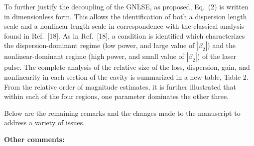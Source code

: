 \documentclass[12pt,twoside,letterpaper]{article}
\begin{document}
To further justify the decoupling of the GNLSE, as proposed, Eq.~(2) is written in dimensionless form. This allows the identification of both a dispersion length scale and a nonlinear length scale in correspondence with the classical analysis found in Ref.~[18]. As in  Ref.~[18], a condition is identified which characterizes the dispersion-dominant regime (low power, and large value of $|\beta_2|$) and the nonlinear-dominant regime (high power, and small value of $|\beta_2|$) of the laser pulse. The complete analysis of the relative size of the loss, dispersion, gain, and nonlinearity in each section of the cavity is summarized in a new table, Table 2. From the relative order of magnitude estimates, it is further illustrated that within each of the four regions, one parameter dominates the other three.

\vspace{\baselineskip}

Below are the remaining remarks and the changes made to the manuscript to 
address a variety of issues.

\vspace{\baselineskip}
\noindent
\textbf{Other comments:}
\end{document}
